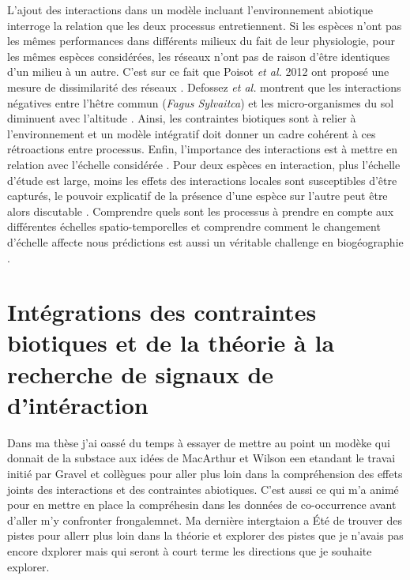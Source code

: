 L'ajout des interactions dans un modèle incluant l'environnement
abiotique interroge la relation que les deux processus entretiennent. Si
les espèces n'ont pas les mêmes performances dans différents milieux du
fait de leur physiologie, pour les mêmes espèces considérées, les
réseaux n'ont pas de raison d'être identiques d'un milieu à un autre.
C'est sur ce fait que Poisot \textit{et al.} 2012 ont proposé une mesure
de dissimilarité des réseaux \cite{Poisot2012}. Defossez \textit{et al.}
montrent que les interactions négatives entre l'hêtre commun
(\textit{Fagus Sylvaitca}) et les micro-organismes du sol diminuent avec
l'altitude \cite{Defossez2011}. Ainsi, les contraintes biotiques sont à
relier à l'environnement \cite{Brooker2006,Canham2006} et un modèle
intégratif doit donner un cadre cohérent à ces rétroactions entre
processus. Enfin, l'importance des interactions est à mettre en relation
avec l'échelle considérée \cite{Peterson2011}. Pour deux espèces en
interaction, plus l'échelle d'étude est large, moins les effets des
interactions locales sont susceptibles d'être capturés, le pouvoir
explicatif de la présence d'une espèce sur l'autre peut être alors
discutable \cite{Araujo2007}. Comprendre quels sont les processus à
prendre en compte aux différentes échelles spatio-temporelles et
comprendre comment le changement d'échelle affecte nous prédictions est
aussi un véritable challenge en biogéographie \cite{Martinez2012}.

\section*{Intégrations des contraintes biotiques et de la théorie à la
recherche de signaux de
d'intéraction}\label{intuxe9grations-des-contraintes-biotiques-et-de-la-thuxe9orie-uxe0-la-recherche-de-signaux-de-dintuxe9raction}

Dans ma thèse j'ai oassé du temps à essayer de mettre au point un modèke
qui donnait de la substace aux idées de MacArthur et Wilson een etandant
le travai initié par Gravel et collègues pour aller plus loin dans la
compréhension des effets joints des interactions et des contraintes
abiotiques. C'est aussi ce qui m'a animé pour en mettre en place la
compréhesin dans les données de co-occurrence avant d'aller m'y
confronter frongalemnet. Ma dernière intergtaion a Été de trouver des
pistes pour allerr plus loin dans la théorie et explorer des pistes que
je n'avais pas encore dxplorer mais qui seront à court terme les
directions que je souhaite explorer.

